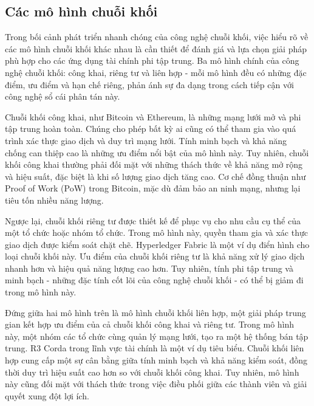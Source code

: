 \subsection{Các mô hình chuỗi khối}

\hspace{1cm}Trong bối cảnh phát triển nhanh chóng của công nghệ chuỗi khối,
việc hiểu rõ về các mô hình chuỗi khối khác nhau là cần thiết để đánh giá và
lựa chọn giải pháp phù hợp cho các ứng dụng tài chính phi tập trung. Ba mô hình
chính của công nghệ chuỗi khối: công khai, riêng tư và liên hợp - mỗi mô hình
đều có
những đặc điểm, ưu điểm và hạn chế riêng, phản ánh sự đa dạng trong cách tiếp
cận với công nghệ sổ cái phân tán này.

Chuỗi khối công khai, như Bitcoin và Ethereum, là những mạng lưới mở và phi
tập trung hoàn toàn. Chúng cho phép bất kỳ ai cũng có thể tham gia vào quá
trình xác thực giao dịch và duy trì mạng lưới. Tính minh bạch và khả năng chống
can thiệp cao là những ưu điểm nổi bật của mô hình này. Tuy nhiên, chuỗi khối
công khai thường phải đối mặt với những thách thức về khả năng mở rộng và hiệu
suất, đặc biệt là khi số lượng giao dịch tăng cao. Cơ chế đồng thuận như Proof
of Work (PoW) trong Bitcoin, mặc dù đảm bảo an ninh mạng, nhưng lại tiêu tốn
nhiều năng lượng.

Ngược lại, chuỗi khối riêng tư được thiết kế để phục vụ cho nhu cầu cụ thể của
một tổ chức hoặc nhóm tổ chức. Trong mô hình này, quyền tham gia và xác thực
giao dịch được kiểm soát chặt chẽ. Hyperledger Fabric là một ví dụ điển hình
cho loại chuỗi khối này. Ưu điểm của chuỗi khối riêng tư là khả năng xử lý giao
dịch nhanh hơn và hiệu quả năng lượng cao hơn. Tuy nhiên, tính phi tập trung và
minh bạch - những đặc tính cốt lõi của công nghệ chuỗi khối - có thể bị giảm đi
trong mô
hình này.

Đứng giữa hai mô hình trên là mô hình chuỗi khối liên hợp, một giải pháp trung
gian kết
hợp ưu điểm của cả chuỗi khối công khai và riêng tư. Trong mô hình này, một
nhóm các tổ chức cùng quản lý mạng lưới, tạo ra một hệ thống bán tập trung. R3
Corda trong lĩnh vực tài chính là một ví dụ tiêu biểu. Chuỗi khối liên hợp cung
cấp một sự cân bằng giữa tính minh bạch và khả năng kiểm soát, đồng thời duy
trì hiệu suất cao hơn so với chuỗi khối công khai. Tuy nhiên, mô hình này cũng
đối mặt với thách thức trong việc điều phối giữa các thành viên và giải quyết
xung đột lợi ích.

